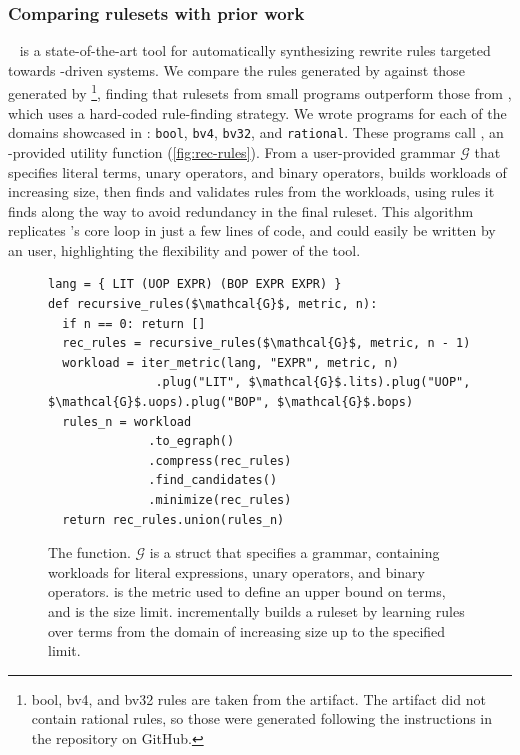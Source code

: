 \subsubsection{Comparing rulesets with prior work}
\label{subsubsec:e-vs-r}
~\citep{ruler} is a state-of-the-art
  tool for automatically
  synthesizing rewrite rules targeted towards \eqsat-driven
  systems.
We compare the rules generated by \enumo
  against those generated by \footnote{bool, bv4, and bv32
  rules are taken from the  artifact. The artifact did not contain
  rational rules, so those were generated following the instructions in
  the  repository on GitHub.},
  finding that
  rulesets from small \enumo programs outperform
  those from ,
  which uses a hard-coded rule-finding
  strategy.
We wrote \enumo programs for
  each of the domains showcased in :
  \texttt{bool}, \texttt{bv4}, \texttt{bv32}, and \texttt{rational}.
These programs call ,
an \enumo-provided utility function (\autoref{fig:rec-rules}).
From a user-provided grammar $\mathcal{G}$ that specifies literal terms,
  unary operators, and binary operators,  builds
  workloads of increasing size, then finds and validates rules from
  the workloads, using rules it finds along the way to avoid redundancy
  in the final ruleset.
This algorithm
 replicates 's core loop in just a few lines of
\enumo code, and could easily be written by an \enumo user,
highlighting the flexibility and power of the tool.
\begin{figure}
\begin{lstlisting}
lang = { LIT (UOP EXPR) (BOP EXPR EXPR) }
def recursive_rules($\mathcal{G}$, metric, n):
  if n == 0: return []
  rec_rules = recursive_rules($\mathcal{G}$, metric, n - 1)
  workload = iter_metric(lang, "EXPR", metric, n)
               .plug("LIT", $\mathcal{G}$.lits).plug("UOP", $\mathcal{G}$.uops).plug("BOP", $\mathcal{G}$.bops)
  rules_n = workload
              .to_egraph()
              .compress(rec_rules)
              .find_candidates()
              .minimize(rec_rules)
  return rec_rules.union(rules_n)
\end{lstlisting}
\caption{The  function. $\mathcal{G}$ is a struct that
  specifies a grammar, containing workloads for literal expressions,
  unary operators, and binary operators.  is the \enumo metric
  used to define an upper bound on terms, and  is the size limit.
   incrementally builds a ruleset by learning rules
  over terms from the domain of increasing size up to the
  specified limit.}
\label{fig:rec-rules}
\end{figure}

